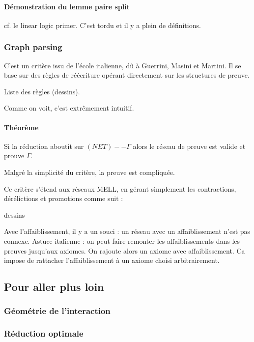 \documentclass[a4paper, 11pt]{article}
\begin{document}
\paragraph{Démonstration du lemme paire split}

cf. le linear logic primer. C'est tordu et il y a plein de définitions.


\subsubsection{Graph parsing}

C'est un critère issu de l'école italienne, dû à Guerrini, Masini et Martini. Il se base sur des règles de réécriture opérant directement sur les structures de preuve.

Liste des règles (dessins).

Comme on voit, c'est extrêmement intuitif.

\paragraph{Théorème} Si la réduction aboutit sur $(NET) -- \Gamma$ alors le réseau de preuve est valide et prouve $\Gamma$.

Malgré la simplicité du critère, la preuve est compliquée.

Ce critère s'étend aux réseaux MELL, en gérant simplement les contractions, dérélictions et promotions comme suit :

dessins

Avec l'affaiblissement, il y a un souci : un réseau avec un affaiblissement n'est pas connexe. Astuce italienne : on peut faire remonter les affaiblissements dans les preuves jusqu'aux axiomes. On rajoute alors un axiome avec affaiblissement. Ca impose de rattacher l'affaiblissement à un axiome choisi arbitrairement.

\subsection{Pour aller plus loin}

\subsubsection{Géométrie de l'interaction}

\subsubsection{Réduction optimale}
\end{document}
